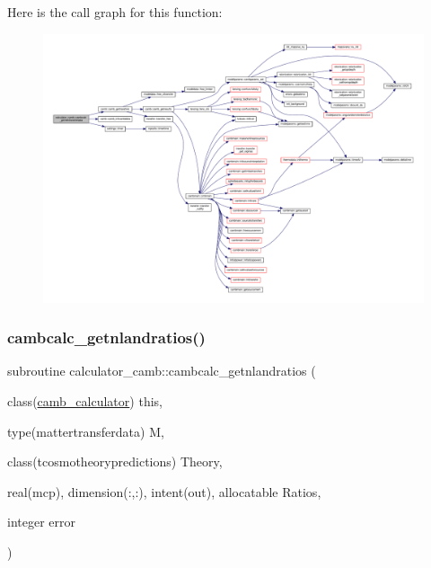 Here is the call graph for this function\+:
\nopagebreak
\begin{figure}[H]
\begin{center}
\leavevmode
\includegraphics[width=350pt]{namespacecalculator__camb_a9e8887a3ae9da2bb092aac4285234df4_cgraph}
\end{center}
\end{figure}
\mbox{\label{namespacecalculator__camb_ac0ce3e4748dd96f033235b9dbf3a71b3}} 
\subsubsection{\texorpdfstring{cambcalc\+\_\+getnlandratios()}{cambcalc\_getnlandratios()}}
{\footnotesize\ttfamily subroutine calculator\+\_\+camb\+::cambcalc\+\_\+getnlandratios (\begin{DoxyParamCaption}\item[{class(\mbox{\hyperlink{structcalculator__camb_1_1camb__calculator}{camb\+\_\+calculator}})}]{this,  }\item[{type(mattertransferdata)}]{M,  }\item[{class(tcosmotheorypredictions)}]{Theory,  }\item[{real(mcp), dimension(\+:,\+:), intent(out), allocatable}]{Ratios,  }\item[{integer}]{error }\end{DoxyParamCaption})}



